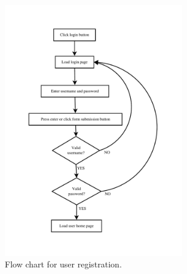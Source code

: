 \documentclass[12pt]{paper}
\begin{document}
\begin{figure}[h!]
\centering
\includegraphics[width=0.7\textwidth]{flowcharts/login}
\caption{Flow chart for user registration.}
\end{figure}
\end{document}
